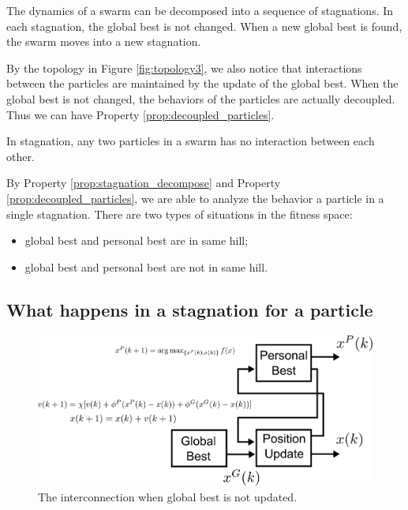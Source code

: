 \begin{property}
\label{prop:stagnation_decompose}
The dynamics of a swarm can be decomposed into a sequence of stagnations.
In each stagnation, the global best is not changed.
When a new global best is found, the swarm moves into a new stagnation.
\end{property}

By the topology in Figure \ref{fig:topology3}, we also notice that interactions between the particles are maintained by the update of the global best.
When the global best is not changed, the behaviors of the particles are actually decoupled.
Thus we can have Property \ref{prop:decoupled_particles}.

\begin{property}
\label{prop:decoupled_particles}
In stagnation, any two particles in a swarm has no interaction between each other.
\end{property}

By Property \ref{prop:stagnation_decompose} and Property \ref{prop:decoupled_particles}, we are able to analyze the behavior a particle in a single stagnation.
There are two types of situations in the fitness space:
\begin{itemize}
\item global best and personal best are in same hill;
\item global best and personal best are not in same hill.
\end{itemize}

\subsection{What happens in a stagnation for a particle}

\begin{figure}
\centering
\includegraphics[width=0.8\linewidth]{./structure_constant_gb}
\caption{The interconnection when global best is not updated.}
\label{fig:structure_constant_gb}
\end{figure}

